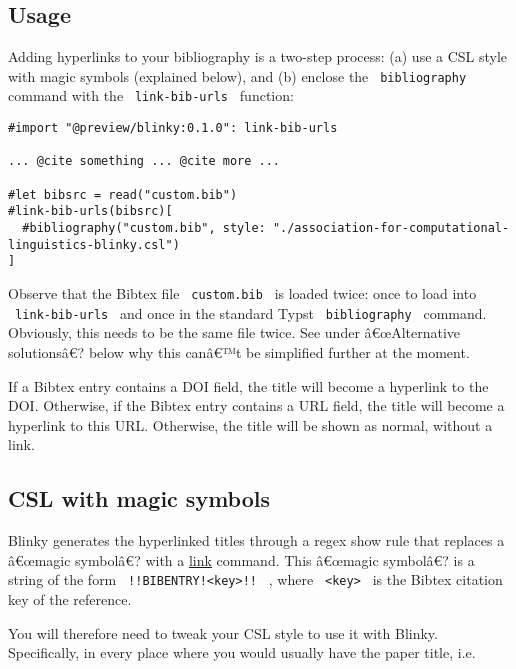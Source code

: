\subsection{Usage}\label{usage}

Adding hyperlinks to your bibliography is a two-step process: (a) use a
CSL style with magic symbols (explained below), and (b) enclose the
\texttt{\ bibliography\ } command with the \texttt{\ link-bib-urls\ }
function:

\begin{verbatim}
#import "@preview/blinky:0.1.0": link-bib-urls

... @cite something ... @cite more ...

#let bibsrc = read("custom.bib")
#link-bib-urls(bibsrc)[
  #bibliography("custom.bib", style: "./association-for-computational-linguistics-blinky.csl")
]
\end{verbatim}

Observe that the Bibtex file \texttt{\ custom.bib\ } is loaded twice:
once to load into \texttt{\ link-bib-urls\ } and once in the standard
Typst \texttt{\ bibliography\ } command. Obviously, this needs to be the
same file twice. See under â€œAlternative solutionsâ€? below why this
canâ€™t be simplified further at the moment.

If a Bibtex entry contains a DOI field, the title will become a
hyperlink to the DOI. Otherwise, if the Bibtex entry contains a URL
field, the title will become a hyperlink to this URL. Otherwise, the
title will be shown as normal, without a link.

\subsection{CSL with magic symbols}\label{csl-with-magic-symbols}

Blinky generates the hyperlinked titles through a regex show rule that
replaces a â€œmagic symbolâ€? with a
\href{https://typst.app/docs/reference/model/link/}{link} command. This
â€œmagic symbolâ€? is a string of the form
\texttt{\ !!BIBENTRY!\textless{}key\textgreater{}!!\ } , where
\texttt{\ \textless{}key\textgreater{}\ } is the Bibtex citation key of
the reference.

You will therefore need to tweak your CSL style to use it with Blinky.
Specifically, in every place where you would usually have the paper
title, i.e.

\begin{verbatim}
\end{verbatim}

